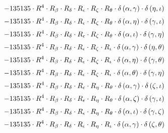 \begin{subequations}
\begin{gather}
 \\[0.2em] \notag 		 - 135135 \cdot R^{4} \cdot R_{\beta{}} \cdot R_{\delta{}} \cdot R_{\epsilon{}} \cdot R_{\zeta{}} \cdot R_{\theta{}} \cdot \delta{}\left(\alpha{}, \gamma{}\right) \cdot \delta{}\left(\eta{}, \iota{}\right) 
 \\[0.2em] \notag 		 - 135135 \cdot R^{4} \cdot R_{\beta{}} \cdot R_{\delta{}} \cdot R_{\epsilon{}} \cdot R_{\zeta{}} \cdot R_{\theta{}} \cdot \delta{}\left(\alpha{}, \eta{}\right) \cdot \delta{}\left(\gamma{}, \iota{}\right) 
 \\[0.2em] \notag 		 - 135135 \cdot R^{4} \cdot R_{\beta{}} \cdot R_{\delta{}} \cdot R_{\epsilon{}} \cdot R_{\zeta{}} \cdot R_{\theta{}} \cdot \delta{}\left(\alpha{}, \iota{}\right) \cdot \delta{}\left(\gamma{}, \eta{}\right) 
 \\[0.2em] \notag 		 - 135135 \cdot R^{4} \cdot R_{\beta{}} \cdot R_{\delta{}} \cdot R_{\epsilon{}} \cdot R_{\zeta{}} \cdot R_{\iota{}} \cdot \delta{}\left(\alpha{}, \gamma{}\right) \cdot \delta{}\left(\eta{}, \theta{}\right) 
 \\[0.2em] \notag 		 - 135135 \cdot R^{4} \cdot R_{\beta{}} \cdot R_{\delta{}} \cdot R_{\epsilon{}} \cdot R_{\zeta{}} \cdot R_{\iota{}} \cdot \delta{}\left(\alpha{}, \eta{}\right) \cdot \delta{}\left(\gamma{}, \theta{}\right) 
 \\[0.2em] \notag 		 - 135135 \cdot R^{4} \cdot R_{\beta{}} \cdot R_{\delta{}} \cdot R_{\epsilon{}} \cdot R_{\zeta{}} \cdot R_{\iota{}} \cdot \delta{}\left(\alpha{}, \theta{}\right) \cdot \delta{}\left(\gamma{}, \eta{}\right) 
 \\[0.2em] \notag 		 - 135135 \cdot R^{4} \cdot R_{\beta{}} \cdot R_{\delta{}} \cdot R_{\epsilon{}} \cdot R_{\eta{}} \cdot R_{\theta{}} \cdot \delta{}\left(\alpha{}, \gamma{}\right) \cdot \delta{}\left(\zeta{}, \iota{}\right) 
 \\[0.2em] \notag 		 - 135135 \cdot R^{4} \cdot R_{\beta{}} \cdot R_{\delta{}} \cdot R_{\epsilon{}} \cdot R_{\eta{}} \cdot R_{\theta{}} \cdot \delta{}\left(\alpha{}, \zeta{}\right) \cdot \delta{}\left(\gamma{}, \iota{}\right) 
 \\[0.2em] \notag 		 - 135135 \cdot R^{4} \cdot R_{\beta{}} \cdot R_{\delta{}} \cdot R_{\epsilon{}} \cdot R_{\eta{}} \cdot R_{\theta{}} \cdot \delta{}\left(\alpha{}, \iota{}\right) \cdot \delta{}\left(\gamma{}, \zeta{}\right) 
 \\[0.2em] \notag 		 - 135135 \cdot R^{4} \cdot R_{\beta{}} \cdot R_{\delta{}} \cdot R_{\epsilon{}} \cdot R_{\eta{}} \cdot R_{\iota{}} \cdot \delta{}\left(\alpha{}, \gamma{}\right) \cdot \delta{}\left(\zeta{}, \theta{}\right) 

\end{gather}
\end{subequations}
